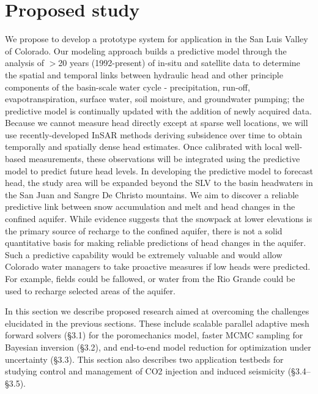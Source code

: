 \documentclass[11pt,final]{article}%
\begin{document}
\section{Proposed study}
We propose to develop a prototype system for application in the San Luis Valley of Colorado. Our modeling approach builds a predictive model through the analysis of $>$20 years (1992-present) of in-situ and satellite data to determine the spatial and temporal links between hydraulic head and other principle components of the basin-scale water cycle - precipitation, run-off, evapotranspiration, surface water, soil moisture, and groundwater pumping; the predictive model is continually updated with the addition of newly acquired data. Because we cannot measure head directly except at sparse well locations, we will use recently-developed InSAR methods deriving subsidence over time to obtain temporally and spatially dense head estimates.  Once calibrated with local well-based measurements, these observations will be integrated using the predictive model to predict future head levels. In developing the predictive model to forecast head, the study area will be expanded beyond the SLV to the basin headwaters in the San Juan and Sangre De Christo mountains. We aim to discover a reliable predictive link between snow accumulation and melt and head changes in the confined aquifer.  While evidence suggests that the snowpack at lower elevations is the primary source of recharge to the confined aquifer, there is not a solid quantitative basis for making reliable predictions of head changes in the aquifer.  Such a predictive capability would be extremely valuable and would allow Colorado water managers to take proactive measures if low heads were predicted.  For example, fields could be fallowed, or water from the Rio Grande could be used to recharge selected areas of the aquifer.


In this section we describe proposed research aimed at overcoming the challenges elucidated in the previous sections. These include scalable parallel adaptive mesh forward solvers (§3.1) for the poromechanics model, faster MCMC sampling for Bayesian inversion (§3.2), and end-to-end model reduction for optimization under uncertainty (§3.3). This section also describes two application testbeds for studying control and management of CO2 injection and induced seismicity (§3.4–§3.5).
\end{document}
